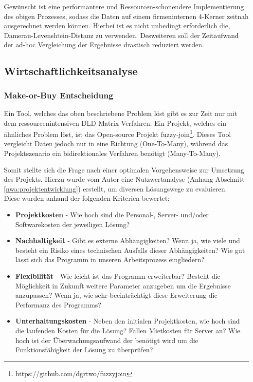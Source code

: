 Gewünscht ist eine performantere und Ressourcen-schonendere Implementierung des obigen Prozesses,
sodass die Daten auf einem firmeninternen 4-Kerner zeitnah ausgerechnet werden können.
Hierbei ist es nicht unbedingt erforderlich die, Damerau-Levenshtein-Distanz zu verwenden. Desweiteren soll der Zeitaufwand der ad-hoc 
Vergleichung der Ergebnisse drastisch reduziert werden.\par




\subsection{Wirtschaftlichkeitsanalyse}
\subsubsection{Make-or-Buy Entscheidung}
Ein Tool, welches das oben beschriebene Problem löst gibt es zur Zeit nur mit dem
ressourcenintensiven DLD-Matrix-Verfahren. Ein Projekt, welches ein ähnliches
Problem löst, ist das Open-source Projekt fuzzy-join\footnote{https://github.com/dgrtwo/fuzzyjoin}.
Dieses Tool vergleicht Daten jedoch nur in eine Richtung (One-To-Many), während das Projektszenario ein bidirektionales Verfahren benötigt (Many-To-Many).\par

Somit stellte sich die Frage nach einer optimalen Vorgehensweise zur Umsetzung des
Projekts. Hierzu wurde vom Autor eine Nutzwertanalyse (Anhang Abschnitt \ref{nwa:projektentwicklung}) erstellt, um diversen Lösungswege zu evaluieren. \\
Diese wurden anhand der folgenden Kriterien bewertet:


\begin{itemize}
    \item \textbf{Projektkosten} - Wie hoch sind die Personal-, Server- und/oder Softwarekosten der jeweiligen Lösung?

    \item \textbf{Nachhaltigkeit} - Gibt es externe Abhängigkeiten? Wenn ja, wie viele und besteht ein Risiko eines technischen Ausfalls dieser Abhängigkeiten? Wie gut lässt sich das Programm in unseren Arbeitsprozess eingliedern? 

    \item \textbf{Flexibilität} - Wie leicht ist das Programm erweiterbar? Besteht die Möglichkeit in Zukunft weitere Parameter anzugeben um die Ergebnisse anzupassen? Wenn ja, wie sehr beeinträchtigt diese Erweiterung die Performanz des Programms?

    \item \textbf{Unterhaltungskosten} - Neben den initialen Projektkosten, wie hoch sind die laufenden Kosten für die Lösung? Fallen Mietkosten für Server an? Wie hoch ist der Überwachungsaufwand der benötigt wird um die Funktionsfähigkeit der Lösung zu überprüfen?

\end{itemize}



